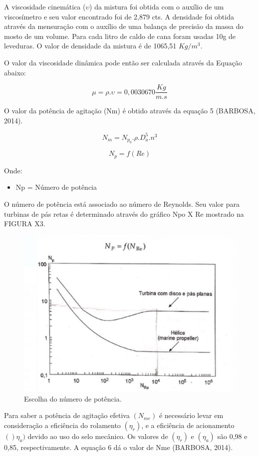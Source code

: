 A viscosidade cinemática (\(\upsilon\)) da mistura foi obtida com o auxílio de um viscosímetro e seu valor encontrado foi de 2,879 cts.
A densidade foi obtida através da mensuração com o auxílio de uma balança de precisão da massa do mosto de um volume. Para cada litro de caldo de cana foram usadas 10g de leveduras. O valor de densidade da mistura é de 1065,51 \(Kg/m^3\).

O valor da viscosidade dinâmica pode então ser calculada através da Equação abaixo:

\[\mu=\rho.\upsilon = 0,0030670 \frac{Kg}{m.s}\]

O valor da potência de agitação (Nm) é obtido através da equação 5 (BARBOSA, 2014).

\[N_{m}=N_{p_0}.\rho.D_a^5.n^{3}\]

\[N_{p}=f(Re)\]

Onde:
\begin{itemize}
	\item Np = Número de potência
\end{itemize}

O número de potência está associado ao número de Reynolds. Seu valor para turbinas de pás retas é determinado através do gráfico Npo X Re mostrado na FIGURA X3.

\begin{figure}[h]
 \centering
 \includegraphics[keepaspectratio=true,scale=0.5]{figuras/potencia.eps}
 \caption{Escolha do número de potência.}
 \label{potencia}
\end{figure}

Para saber a potência de agitação efetiva \((N_{me})\) é necessário levar em consideração a eficiência do rolamento \((\eta_{r})\), e a eficiência de acionamento \(()\eta_{a})\) devido ao uso do selo mecânico. Os valores de \((\eta_{r})\) e \((\eta_{a})\) são 0,98 e 0,85, respectivamente. A equação 6 dá o valor de Nme (BARBOSA, 2014).

